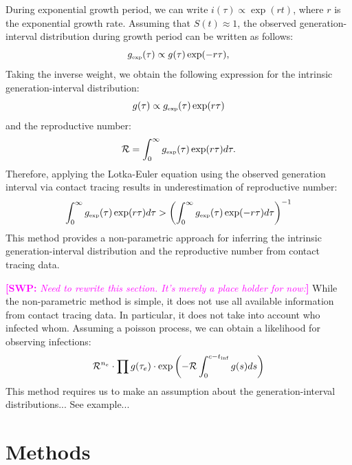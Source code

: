 \documentclass{article}
\newcommand{\RR}{\ensuremath{{\mathcal R}}}
\newcommand{\tsub}[2]{#1_{{\textrm{\tiny #2}}}}
\newcommand{\comment}[3]{\textcolor{#1}{\textbf{[#2: }\textsl{#3}\textbf{]}}}
\newcommand{\swp}[1]{\comment{magenta}{SWP}{#1}}
\begin{document}
During exponential growth period, we can write $i(\tau) \propto \exp(r t)$, where $r$ is the exponential growth rate.
Assuming that $S(t) \approx 1$, the observed generation-interval distribution during growth period can be written as follows:
\begin{equation}
\tsub{g}{exp}(\tau) \propto g(\tau) \exp(-r\tau),
\end{equation}
Taking the inverse weight, we obtain the following expression for the intrinsic generation-interval distribution:
\begin{equation}
g(\tau) \propto \tsub{g}{exp}(\tau) \exp(r\tau)
\end{equation}
and the reproductive number:
\begin{equation}
\RR = \int_0^\infty \tsub{g}{exp}(\tau) \exp(r\tau) d\tau.
\end{equation}
Therefore, applying the Lotka-Euler equation using the observed generation interval via contact tracing results in underestimation of reproductive number:
\begin{equation}
\int_0^\infty \tsub{g}{exp}(\tau) \exp(r\tau) d\tau > \left(\int_0^\infty \tsub{g}{exp}(\tau) \exp(-r\tau) d\tau\right)^{-1}
\end{equation}
This method provides a non-parametric approach for inferring the intrinsic generation-interval distribution and the reproductive number from contact tracing data.

\swp{Need to rewrite this section. It's merely a place holder for now:}
While the non-parametric method is simple, it does not use all available information from contact tracing data.
In particular, it does not take into account who infected whom.
Assuming a poisson process, we can obtain a likelihood for observing infections:
\begin{equation}
\RR^{n_e} \cdot \prod g(\tau_e) \cdot \exp \left(- \RR \int_0^{c - t_{\tiny\textrm{inf}}} g(s) ds \right)
\end{equation}
This method requires us to make an assumption about the generation-interval distributions... See example...




\section{Methods}




\end{document}
